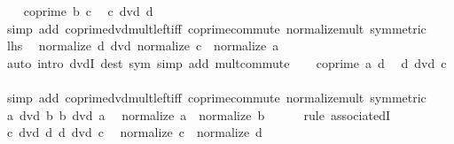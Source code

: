 \begin{isabellebody}
\ \ \isamarkupfalse%
\ {\isacartoucheopen}coprime\ b\ c{\isacartoucheclose}\ \isamarkupfalse%
\ {\isachardoublequoteopen}c\ dvd\ d{\isachardoublequoteclose}\isanewline
\ \ \ \ \isamarkupfalse%
\ {\isacharparenleft}{\kern0pt}simp\ add{\isacharcolon}{\kern0pt}\ coprime{\isacharunderscore}{\kern0pt}dvd{\isacharunderscore}{\kern0pt}mult{\isacharunderscore}{\kern0pt}left{\isacharunderscore}{\kern0pt}iff\ coprime{\isacharunderscore}{\kern0pt}commute\ normalize{\isacharunderscore}{\kern0pt}mult\ {\isacharbrackleft}{\kern0pt}symmetric{\isacharbrackright}{\kern0pt}{\isacharparenright}{\kern0pt}\isanewline
\ \ \isamarkupfalse%
\ {\isacartoucheopen}{\isacharquery}{\kern0pt}lhs{\isacartoucheclose}\ \isamarkupfalse%
\ {\isachardoublequoteopen}normalize\ d\ dvd\ normalize\ c\ {\isacharasterisk}{\kern0pt}\ normalize\ a{\isachardoublequoteclose}\isanewline
\ \ \ \ \isamarkupfalse%
\ {\isacharparenleft}{\kern0pt}auto\ intro{\isacharcolon}{\kern0pt}\ dvdI\ dest{\isacharcolon}{\kern0pt}\ sym\ simp\ add{\isacharcolon}{\kern0pt}\ mult{\isachardot}{\kern0pt}commute{\isacharparenright}{\kern0pt}\isanewline
\ \ \isamarkupfalse%
\ {\isacartoucheopen}coprime\ a\ d{\isacartoucheclose}\ \isamarkupfalse%
\ {\isachardoublequoteopen}d\ dvd\ c{\isachardoublequoteclose}\isanewline
\ \ \ \ \isamarkupfalse%
\ {\isacharparenleft}{\kern0pt}simp\ add{\isacharcolon}{\kern0pt}\ coprime{\isacharunderscore}{\kern0pt}dvd{\isacharunderscore}{\kern0pt}mult{\isacharunderscore}{\kern0pt}left{\isacharunderscore}{\kern0pt}iff\ coprime{\isacharunderscore}{\kern0pt}commute\ normalize{\isacharunderscore}{\kern0pt}mult\ {\isacharbrackleft}{\kern0pt}symmetric{\isacharbrackright}{\kern0pt}{\isacharparenright}{\kern0pt}\isanewline
\ \ \isamarkupfalse%
\ {\isacartoucheopen}a\ dvd\ b{\isacartoucheclose}\ {\isacartoucheopen}b\ dvd\ a{\isacartoucheclose}\ \isamarkupfalse%
\ {\isachardoublequoteopen}normalize\ a\ {\isacharequal}{\kern0pt}\ normalize\ b{\isachardoublequoteclose}\isanewline
\ \ \ \ \isamarkupfalse%
\ {\isacharparenleft}{\kern0pt}rule\ associatedI{\isacharparenright}{\kern0pt}\isanewline
\ \ \isamarkupfalse%
\ \isamarkupfalse%
\ {\isacartoucheopen}c\ dvd\ d{\isacartoucheclose}\ {\isacartoucheopen}d\ dvd\ c{\isacartoucheclose}\ \isamarkupfalse%
\ {\isachardoublequoteopen}normalize\ c\ {\isacharequal}{\kern0pt}\ normalize\ d{\isachardoublequoteclose}\isanewline

\end{isabellebody}
